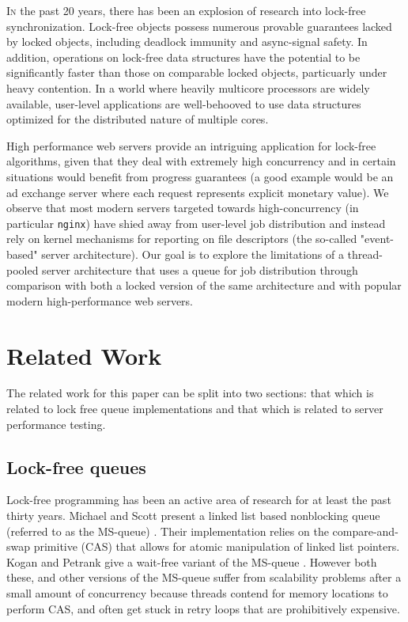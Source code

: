 \documentclass[twoside]{article}
\begin{document}
\begin{multicols}{2}
  \lettrine[nindent=0em,lines=3]{I}n the past 20 years, there has been
  an explosion of research into lock-free synchronization. Lock-free
  objects possess numerous provable guarantees lacked by locked
  objects, including deadlock immunity and async-signal safety. In
  addition, operations on lock-free data structures have the potential
  to be significantly faster than those on comparable locked objects,
  particuarly under heavy contention. In a world where heavily
  multicore processors are widely available, user-level applications
  are well-behooved to use data structures optimized for the
  distributed nature of multiple cores.
  
High performance web servers provide an intriguing application for
lock-free algorithms, given that they deal with extremely high
concurrency and in certain situations would benefit from progress
guarantees (a good example would be an ad exchange server where each
request represents explicit monetary value). We observe that most
modern servers targeted towards high-concurrency (in particular
\verb+nginx+) have shied away from user-level job distribution and
instead rely on kernel mechanisms for reporting on file descriptors
(the so-called "event-based" server architecture). Our goal is to
explore the limitations of a thread-pooled server architecture that
uses a queue for job distribution through comparison with both a
locked version of the same architecture and with popular modern
high-performance web servers.

\section{Related Work}

The related work for this paper can be split into two sections: that
which is related to lock free queue implementations and that which is
related to server performance testing.

\subsection{Lock-free queues}

Lock-free programming has been an active area of research for at least
the past thirty years. Michael and Scott present a linked list based
nonblocking queue (referred to as the MS-queue) \cite{MS96}. Their
implementation relies on the compare-and-swap primitive (CAS) that
allows for atomic manipulation of linked list pointers. Kogan and
Petrank give a wait-free variant of the MS-queue \cite{KP11}. However
both these, and other versions of the MS-queue suffer from scalability
problems after a small amount of concurrency because threads contend
for memory locations to perform CAS, and often get stuck in retry
loops that are prohibitively expensive.


\end{multicols}
\end{document}
